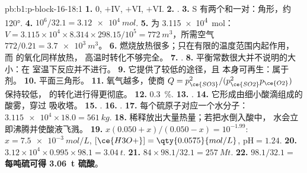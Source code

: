 \begin{solution}{pb:b1:p-block-16-18:1}
\textbf{1.} 0, $+$IV, $+$VI, $+$VI.
\textbf{2.} .
\textbf{3.} S 有两个和一对：角形，约
\ang{120}.
\textbf{4.} $10^6/32.1 = \qty{3.12e4}{mol}$.
\textbf{5.}  为 \qty{3.115e4}{mol}：$V = 3.115 \times 10^4 \times
8.314 \times 298.15/10^5 = \qty{772}{m^3}$，所需空气 $772/0.21 = \qty{3.7e3}{m^3}$。
\textbf{6.} 燃烧放热很多；只在有限的温度范围内起作用，
而  的氧化同样放热，
高温时转化不够完全。
\textbf{7.} .
\textbf{8.} 平衡常数很大并不说明的大小：在
室温下反应并不进行。
\textbf{9.} 它提供了较低的途径，且
本身可再生：属于剂。
\textbf{10.} 平面三角形。
\textbf{11.} 氧气越多，使商
$Q = p_{\ce{SO3}}^2/(p_{\ce{SO2}}^2 p_{\ce{O2}})$ 保持较低，
 的转化进行得更彻底。
\textbf{12.} \qty{0.3}{\percent}.
\textbf{13.} .
\textbf{14.} 它形成由细小酸滴组成的酸雾，穿过
吸收塔。
\textbf{15.} .
\textbf{16.} .
\textbf{17.} 每个硫原子对应一个水分子：$\num{3.115e4} \times 18.0 =
\qty{561}{kg}$.
\textbf{18.} 稀释放出大量热量；若把水倒入酸中，
水会立即沸腾并使酸液飞溅。
\textbf{19.} $x(0.050 + x)/(0.050 - x) = 10^{-1.99}$: $x = \qty{7.5e-3}{mol/L}$,
$[\ce{H3O+}] = \qty{0.0575}{mol/L}$, $\mathrm{pH} = 1.24$.
\textbf{20.} $3.12 \times 10^4 \times 0.995 \times 98.1 = \qty{3.04}{t}$.
\textbf{21.} $84 \times 98.1/32.1 = \qty{257}{Mt}$.
\textbf{22.} $98.1/32.1 =$ \textbf{每吨硫可得 \qty{3.06}{t}
硫酸}。
\end{solution}
